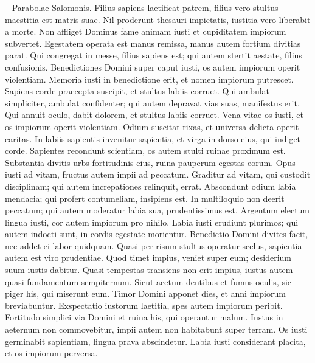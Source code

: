 \begin{biblechapter}   
\verse Parabolae Salomonis. Filius sapiens laetificat patrem, filius vero stultus maestitia est matris suae. 
\verse Nil proderunt thesauri impietatis, iustitia vero liberabit a morte. 
\verse Non affliget Dominus fame animam iusti et cupiditatem impiorum subvertet. 
\verse Egestatem operata est manus remissa, manus autem fortium divitias parat. 
\verse Qui congregat in messe, filius sapiens est; qui autem stertit aestate, filius confusionis. 
\verse Benedictiones Domini super caput iusti, os autem impiorum operit violentiam. 
\verse Memoria iusti in benedictione erit, et nomen impiorum putrescet. 
\verse Sapiens corde praecepta suscipit, et stultus labiis corruet. 
\verse Qui ambulat simpliciter, ambulat confidenter; qui autem depravat vias suas, manifestus erit. 
\verse Qui annuit oculo, dabit dolorem, et stultus labiis corruet. 
\verse Vena vitae os iusti, et os impiorum operit violentiam. 
\verse Odium suscitat rixas, et universa delicta operit caritas. 
\verse In labiis sapientis invenitur sapientia, et virga in dorso eius, qui indiget corde. 
\verse Sapientes recondunt scientiam, os autem stulti ruinae proximum est. 
\verse Substantia divitis urbs fortitudinis eius, ruina pauperum egestas eorum. 
\verse Opus iusti ad vitam, fructus autem impii ad peccatum. 
\verse Graditur ad vitam, qui custodit disciplinam; qui autem increpationes relinquit, errat. 
\verse Abscondunt odium labia mendacia; qui profert contumeliam, insipiens est. 
\verse In multiloquio non deerit peccatum; qui autem moderatur labia sua, prudentissimus est. 
\verse Argentum electum lingua iusti, cor autem impiorum pro nihilo. 
\verse Labia iusti erudiunt plurimos; qui autem indocti sunt, in cordis egestate morientur. 
\verse Benedictio Domini divites facit, nec addet ei labor quidquam. 
\verse Quasi per risum stultus operatur scelus, sapientia autem est viro prudentiae. 
\verse Quod timet impius, veniet super eum; desiderium suum iustis dabitur. 
\verse Quasi tempestas transiens non erit impius, iustus autem quasi fundamentum sempiternum. 
\verse Sicut acetum dentibus et fumus oculis, sic piger his, qui miserunt eum. 
\verse Timor Domini apponet dies, et anni impiorum breviabuntur. 
\verse Exspectatio iustorum laetitia, spes autem impiorum peribit. 
\verse Fortitudo simplici via Domini et ruina his, qui operantur malum. 
\verse Iustus in aeternum non commovebitur, impii autem non habitabunt super terram. 
\verse Os iusti germinabit sapientiam, lingua prava abscindetur. 
\verse Labia iusti considerant placita, et os impiorum perversa. 
\end{biblechapter}

